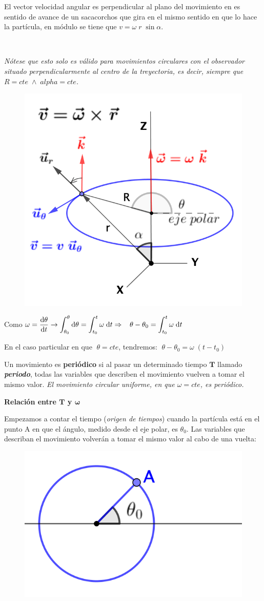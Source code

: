 El vector velocidad angular es perpendicular al plano del movimiento en es sentido de avance de un sacacorchos que gira en el mismo sentido en que lo hace la partícula, en módulo se tiene que $ v=\omega\; r\; \sin \alpha$. 

\begin{multicols}{2}
$\quad$

\emph{Nótese que esto solo es válido para movimientos circulares con el observador situado perpendicularmente al centro de la treyectoria, es decir, siempre que $R=cte \; \wedge \; alpha=cte$.}  
\begin{figure}[H]
		\centering
		\includegraphics[width=.4\textwidth]{imagenes/imagenes02/T02IM09.png}
		\end{figure}
\end{multicols}

Como $\displaystyle \omega=\dv{\theta}{t}\to  \int_{\theta_0}^{\theta}\dd \theta = \int_{t_0}^t \omega \;\dd t \Rightarrow \;\; \;\theta-\theta_0=\int_{t_0}^t \omega \;\dd t\;$

En el caso particular en que $\; \theta = cte$, tendremos: $\;\theta-\theta_0= \omega \;(t-t_0)\;$

Un movimiento es \textbf{periódico} si al pasar un determinado tiempo $\boldsymbol{T}$ llamado \textit{\textbf{periodo}},  todas las variables que describen el movimiento vuelven a tomar el mismo valor. \textit{El movimiento circular uniforme, en que $\omega=cte$, es periódico.}

\textbf{Relación entre $\boldsymbol{T}$ y $\boldsymbol{\omega}$}


\begin{multicols}{2}
Empezamos a contar el tiempo (\emph{origen de tiempos}) cuando la partícula está en el punto A en que el ángulo, medido desde el eje polar, es $\theta_0$. Las variables que describan el movimiento volverán a tomar el mismo valor al cabo de una vuelta:

\begin{figure}[H]
		\centering
		\includegraphics[width=.45\textwidth]{imagenes/imagenes02/T02IM10.png}
		\end{figure}
\end{multicols}

